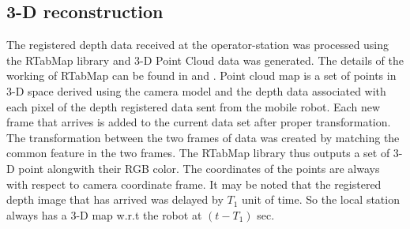 \subsection{3-D reconstruction }
The registered depth data received at the operator-station was processed using the RTabMap library \cite{rtabmap} and 3-D Point Cloud data was generated. The details of the working of RTabMap can be found in \cite{labbertab} and \cite{labbe2013appearance}.  Point cloud map is a set of points in 3-D space derived using the camera model and the depth data associated with each pixel of the depth registered data sent from the mobile robot. Each new frame that arrives is added to the current data set after proper transformation. The transformation between the two frames of data was created by matching the common feature in the two frames. The RTabMap library thus outputs a set of 3-D point alongwith their RGB color. The coordinates of the points are always  with respect to camera coordinate frame. It may be noted that the registered depth image that has arrived was delayed by $T_1$ unit of time. So the local station always has a 3-D map w.r.t  the robot at $(t-T_1)$ sec.
 

